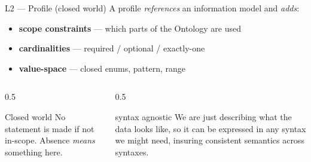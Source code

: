 \begin{frame}{L2 — Profile (closed world)}
	\small
	A profile \emph{references} an information model and \emph{adds}:
	\begin{itemize}
		\item \textbf{scope constraints} — which parts of the Ontology are used
		\item \textbf{cardinalities} — required / optional / exactly-one
		\item \textbf{value-space} — closed enums, pattern, range

	\end{itemize}
	\vspace{0.4em}
	\begin{columns}[T]
		\begin{column}{0.5\textwidth}
			\begin{block}{Closed world}
				No statement is made if not in-scope. Absence \emph{means} something here.
			\end{block}
		\end{column}
		\begin{column}{0.5\textwidth}
			\begin{alertblock}{syntax agnostic}
				We are just describing what the data looks like, so it can be expressed in any syntax we might need, insuring consistent semantics across syntaxes.
			\end{alertblock}
		\end{column}
	\end{columns}
	
\end{frame}
